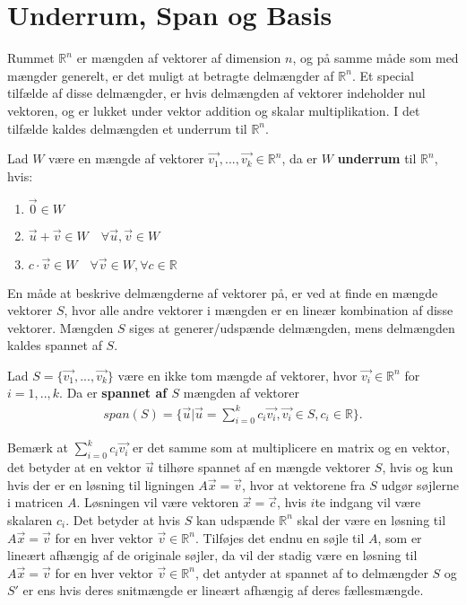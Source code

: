 \section{Underrum, Span og Basis}
Rummet $\mathds{R}^n$ er mængden af vektorer af dimension $n$, og på samme måde som med mængder generelt, er det muligt at betragte delmængder af $\mathds{R}^n$.
Et special tilfælde af disse delmængder, er hvis delmængden af vektorer indeholder nul vektoren, og er lukket under vektor addition og skalar multiplikation. 
I det tilfælde kaldes delmængden et underrum til $\mathds{R}^n$.
\begin{defn}[Underrum]
Lad $W$ være en mængde af vektorer $\vec{v_1},...,\vec{v_k} \in \mathds{R}^n$, da er $W$  \textbf{underrum} til $\mathds{R}^n$, hvis:
\begin{enumerate}[label=\alph*]
\item $\vec{0} \in W$
\item $\vec{u}+\vec{v} \in W \quad \forall \vec{u}, \vec{v} \in W$
\item $c \cdot \vec{v} \in W \quad \forall \vec{v} \in W, \forall c \in \mathds{R}$
\end{enumerate}
\label{def:underrum}
\end{defn}
En måde at beskrive delmængderne af vektorer på, er ved at finde en mængde vektorer $S$, hvor alle andre vektorer i mængden er en lineær kombination af disse vektorer. 
Mængden $S$ siges at generer/udspænde delmængden, mens delmængden kaldes spannet af $S$.
\begin{defn}[Span]
Lad $S=\{\vec{v_1},...,\vec{v_k}\}$ være en ikke tom mængde af vektorer, hvor $\vec{v_i} \in \mathds{R}^n$ for $i = 1,..,k$. 
Da er \textbf{spannet af $S$} mængden af vektorer
\begin{align*}
span(S) = \{\vec{u}| \vec{u}=\sum_{i=0}^k c_i \vec{v_i}, \vec{v_i} \in S, c_i \in \mathds{R}\}.
\end{align*} 
\label{def:span}
\end{defn}
Bemærk at $\sum_{i=0}^k c_i \vec{v_i}$ er det samme som at multiplicere en matrix og en vektor, det betyder at en vektor $\vec{u}$ tilhøre spannet af en mængde vektorer $S$, hvis og kun hvis der er en løsning til ligningen $A\vec{x} = \vec{v}$, hvor at vektorene fra $S$ udgør søjlerne i matricen $A$.
Løsningen vil være vektoren $\vec{x}=\vec{c}$, hvis $i$te indgang vil være skalaren $c_i$.
Det betyder at hvis $S$ kan udspænde $\mathds{R}^n$ skal der være en løsning til $A \vec{x} = \vec{v}$ for en hver vektor $\vec{v} \in \mathds{R}^n$. 
Tilføjes det endnu en søjle til $A$, som er lineært afhængig af de originale søjler, da vil der stadig være en løsning til $A \vec{x} = \vec{v}$ for en hver vektor $\vec{v} \in \mathds{R}^n$, det antyder at spannet af to delmængder $S$ og $S'$ er ens hvis deres snitmængde er lineært afhængig af deres fællesmængde.
